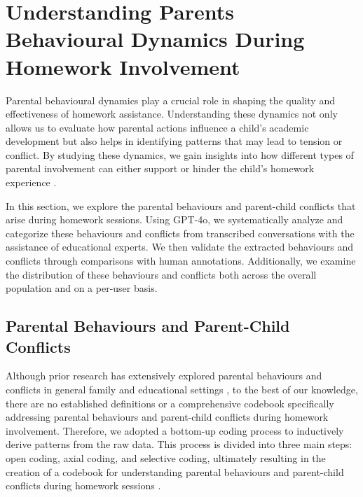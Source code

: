 \section{Understanding Parents Behavioural Dynamics During Homework Involvement}

Parental behavioural dynamics play a crucial role in shaping the quality and effectiveness of homework assistance. Understanding these dynamics not only allows us to evaluate how parental actions influence a child’s academic development but also helps in identifying patterns that may lead to tension or conflict. By studying these dynamics, we gain insights into how different types of parental involvement can either support or hinder the child’s homework experience \cite{eccles1993parent,eccles2013family}.

In this section, we explore the parental behaviours and parent-child conflicts that arise during homework sessions. Using GPT-4o, we systematically analyze and categorize these behaviours and conflicts from transcribed conversations with the assistance of educational experts. We then validate the extracted behaviours and conflicts through comparisons with human annotations. Additionally, we examine the distribution of these behaviours and conflicts both across the overall population and on a per-user basis.


\subsection{Parental Behaviours and Parent-Child Conflicts}


Although prior research has extensively explored parental behaviours and conflicts in general family and educational settings \cite{moe2018brief,solomon2002helping,nnamani2020impact}, to the best of our knowledge, there are no established definitions or a comprehensive codebook specifically addressing parental behaviours and parent-child conflicts during homework involvement. Therefore, we adopted a bottom-up coding process to inductively derive patterns from the raw data. This process is divided into three main steps: open coding, axial coding, and selective coding, ultimately resulting in the creation of a codebook for understanding parental behaviours and parent-child conflicts during homework sessions \cite{corbin1994grounded,charmaz2006constructing,glaser2017discovery}.

